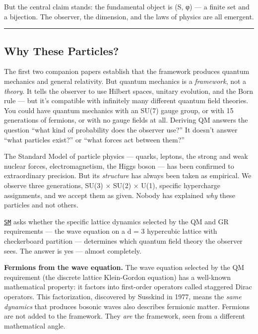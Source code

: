 \documentclass[
]{article}
\begin{document}
But the central claim stands: the fundamental object is (S, φ) --- a
finite set and a bijection. The observer, the dimension, and the laws of
physics are all emergent.

\begin{center}\rule{0.5\linewidth}{0.5pt}\end{center}

\hypertarget{why-these-particles}{%
\subsection{Why These Particles?}\label{why-these-particles}}

The first two companion papers establish that the framework produces
quantum mechanics and general relativity. But quantum mechanics is a
\emph{framework}, not a \emph{theory}. It tells the observer to use
Hilbert spaces, unitary evolution, and the Born rule --- but it's
compatible with infinitely many different quantum field theories. You
could have quantum mechanics with an SU(7) gauge group, or with 15
generations of fermions, or with no gauge fields at all. Deriving QM
answers the question ``what kind of probability does the observer use?''
It doesn't answer ``what particles exist?'' or ``what forces act between
them?''

The Standard Model of particle physics --- quarks, leptons, the strong
and weak nuclear forces, electromagnetism, the Higgs boson --- has been
confirmed to extraordinary precision. But its \emph{structure} has
always been taken as empirical. We observe three generations, SU(3) ×
SU(2) × U(1), specific hypercharge assignments, and we accept them as
given. Nobody has explained \emph{why} these particles and not others.

\href{SM.md}{\texttt{SM}} asks whether the specific lattice dynamics
selected by the QM and GR requirements --- the wave equation on a d = 3
hypercubic lattice with checkerboard partition --- determines which
quantum field theory the observer sees. The answer is yes --- almost
completely.

\textbf{Fermions from the wave equation.} The wave equation selected by
the QM requirement (the discrete lattice Klein-Gordon equation) has a
well-known mathematical property: it factors into first-order operators
called staggered Dirac operators. This factorization, discovered by
Susskind in 1977, means the \emph{same dynamics} that produces bosonic
waves also describes fermionic matter. Fermions are not added to the
framework. They \emph{are} the framework, seen from a different
mathematical angle.
\end{document}
